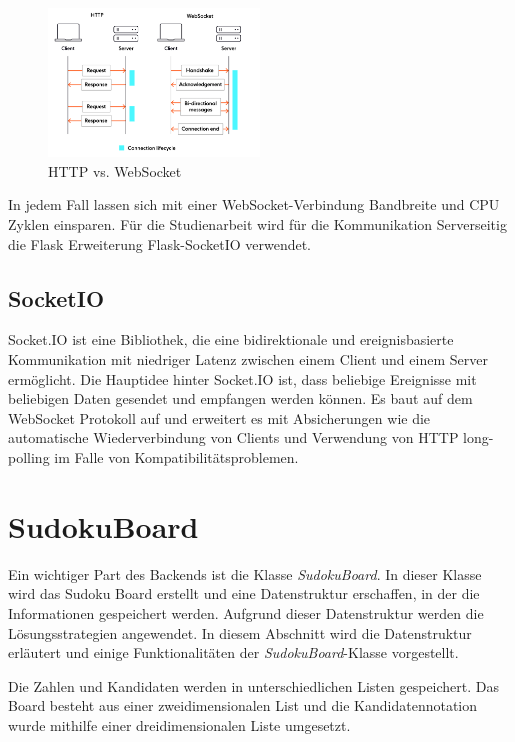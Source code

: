 \begin{figure}[htbp]
	\centering
	\includegraphics[width=0.5\textwidth]{images/Websocket.png}
	\caption{HTTP vs. WebSocket \cite{ably}}
	\label{fig:VergleichWeb}
\end{figure}

In jedem Fall lassen sich mit einer WebSocket-Verbindung Bandbreite und CPU Zyklen einsparen. Für die Studienarbeit wird für die Kommunikation Serverseitig die Flask Erweiterung Flask-SocketIO verwendet.

\subsection{SocketIO}

Socket.IO ist eine Bibliothek, die eine bidirektionale und ereignisbasierte Kommunikation mit niedriger Latenz zwischen einem Client und einem Server ermöglicht. Die Hauptidee hinter Socket.IO ist, dass beliebige Ereignisse mit beliebigen Daten gesendet und empfangen werden können. Es baut auf dem WebSocket Protokoll auf und erweitert es mit Absicherungen wie die automatische Wiederverbindung von Clients und Verwendung von HTTP long-polling im Falle von Kompatibilitätsproblemen.

\section{SudokuBoard}

Ein wichtiger Part des Backends ist die Klasse \textit{SudokuBoard}. In dieser Klasse wird das Sudoku Board erstellt und eine Datenstruktur erschaffen, in der die Informationen gespeichert werden. Aufgrund dieser Datenstruktur werden die Lösungsstrategien angewendet. In diesem Abschnitt wird die Datenstruktur erläutert und einige Funktionalitäten der \textit{SudokuBoard}-Klasse vorgestellt.

Die Zahlen und Kandidaten werden in unterschiedlichen Listen gespeichert. Das Board besteht aus einer zweidimensionalen List und die Kandidatennotation wurde mithilfe einer dreidimensionalen Liste umgesetzt. 

